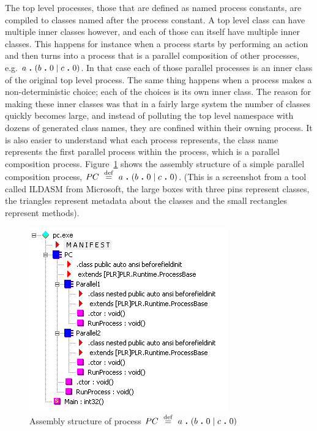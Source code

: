 	The top level processes, those that are defined as named process constants, 
	are compiled to classes named after the process constant. A top level class 
	can have multiple inner classes however, and each of those can itself have 
	multiple inner classes. This happens for instance when a process starts by 
	performing an action and then turns into a process that is a parallel 
	composition of 	other processes, e.g. $a \ \textbf{.}\  (b \ \textbf{.}\  0 \mid c \ \textbf{.}\  
	0)$. In that case each of those parallel processes is an inner class of the 
	original top level process. The same thing happens when a process makes a 
	non-deterministic choice; each of the choices is its own inner class. The 
	reason for making these inner classes was that in a fairly large system the 
	number of classes quickly becomes large, and instead of polluting the top 
	level namespace with dozens of generated class names, they are confined 
	within their owning process. It is also easier to understand what each 
	process represents, the class name  represents the 
	first parallel process within the  process, which is a 
	parallel composition process. Figure~\ref{fig:struct_parallelcomp} shows the 
	assembly structure of a simple parallel composition process, $PC \ \stackrel{\mathrm{def}}{=}\  a 
	\ \textbf{.}\  (b \ \textbf{.}\  0 \mid c \ \textbf{.}\  0)$. (This is a screenshot from a tool 
	called ILDASM from Microsoft, the large boxes with three pins represent 
	classes, the triangles represent metadata about the classes and the small 
	rectangles represent methods).
	
	\begin{figure}
		\begin{center}\includegraphics[scale=0.7]{ex_pc.png}\end{center}
		\caption{Assembly structure of process  $PC \ \stackrel{\mathrm{def}}{=}\  a \ \textbf{.}\  (b \ \textbf{.}\  0 \mid c \ \textbf{.}\  0)$}
		\label{fig:struct_parallelcomp}
	\end{figure}
	
